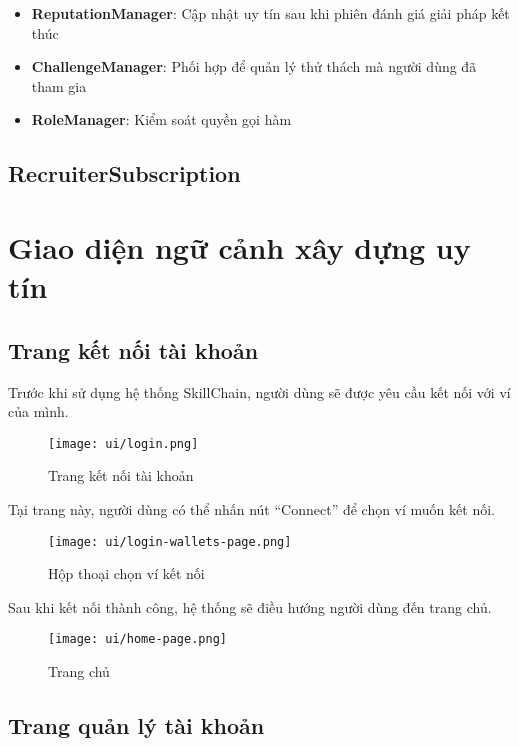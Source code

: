 \begin{itemize}
  \item \textbf{ReputationManager}: Cập nhật uy tín sau khi phiên đánh giá giải pháp kết thúc
  \item \textbf{ChallengeManager}: Phối hợp để quản lý thử thách mà người dùng đã tham gia
  \item \textbf{RoleManager}: Kiểm soát quyền gọi hàm
\end{itemize}

\subsection{RecruiterSubscription}

\section{Giao diện ngữ cảnh xây dựng uy tín}

\subsection{Trang kết nối tài khoản}

Trước khi sử dụng hệ thống SkillChain, người dùng sẽ được yêu cầu kết nối với ví của mình.

\begin{figure}[H]
  \centering
  \texttt{[image: ui/login.png]}
  \caption{Trang kết nối tài khoản}
  \label{fig:login-page}
\end{figure}

Tại trang này, người dùng có thể nhấn nút ``Connect'' để chọn ví muốn kết nối.

\begin{figure}[H]
  \centering
  \texttt{[image: ui/login-wallets-page.png]}
  \caption{Hộp thoại chọn ví kết nối}
  \label{fig:login-wallets-page}
\end{figure}

Sau khi kết nối thành công, hệ thống sẽ điều hướng người dùng đến trang chủ.

\begin{figure}[H]
  \centering
  \texttt{[image: ui/home-page.png]}
  \caption{Trang chủ}
  \label{fig:home-page}
\end{figure}

\subsection{Trang quản lý tài khoản}


